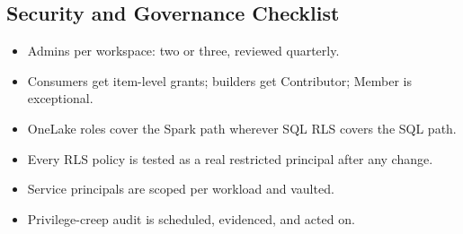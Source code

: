 \subsection{Security and Governance Checklist}
\begin{itemize}
    \item Admins per workspace: two or three, reviewed quarterly.
    \item Consumers get item-level grants; builders get Contributor; Member is exceptional.
    \item OneLake roles cover the Spark path wherever SQL RLS covers the SQL path.
    \item Every RLS policy is tested as a real restricted principal after any change.
    \item Service principals are scoped per workload and vaulted.
    \item Privilege-creep audit is scheduled, evidenced, and acted on.
\end{itemize}


